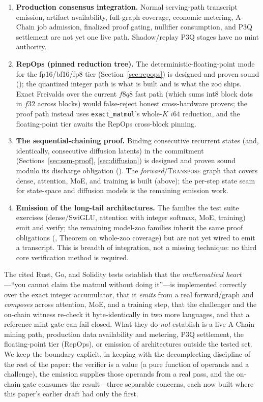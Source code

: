 \begin{enumerate}[leftmargin=1.6em]
\item \textbf{Production consensus integration.} Normal serving-path transcript emission,
artifact availability, full-graph coverage, economic metering, A-Chain job admission,
finalized proof gating, nullifier consumption, and P3Q settlement are not yet one live path.
Shadow/replay P3Q stages have no mint authority.
\item \textbf{RepOps (pinned reduction tree).} The deterministic-floating-point mode for the
fp16/bf16/fp8 tier (Section~\ref{sec:repops}) is designed and proven sound
(\cite{poisoundness}); the quantized integer path is what is built and is what the \Zoo{}
zoo ships. Exact Freivalds over the current $f8q8$ fast path (which sums int8 block dots in
$f32$ across blocks) would false-reject honest cross-hardware provers; the proof path
instead uses \texttt{exact\_matmul}'s whole-$K$ $i64$ reduction, and the floating-point tier
awaits the RepOps cross-block pinning.
\item \textbf{The sequential-chaining proof.} Binding consecutive recurrent states (and,
identically, consecutive diffusion latents) in the commitment
(Sections~\ref{sec:ssm-proof}, \ref{sec:diffusion}) is designed and proven sound modulo its
discharge obligation (\cite{poisoundness}). The \emph{forward}/\textsc{Transpose} graph that
covers dense, attention, MoE, and training is built (above); the per-step state seam for
state-space and diffusion models is the remaining emission work.
\item \textbf{Emission of the long-tail architectures.} The families the test suite
exercises (dense/SwiGLU, attention with integer softmax, MoE, training) emit and verify; the
remaining model-zoo families inherit the same proof obligations (\cite{poisoundness},
Theorem on whole-zoo coverage) but are not yet wired to emit a transcript. This is breadth
of integration, not a missing technique: no third core verification method is required.
\end{enumerate}

\begin{remark}
The cited Rust, Go, and Solidity tests establish that the
\emph{mathematical heart}---``you cannot claim the matmul without doing it''---is
implemented correctly over the exact integer accumulator, that it \emph{emits} from a real
forward/graph and \emph{composes} across attention, MoE, and a training step, that the
challenger and the on-chain witness re-check it byte-identically in two more languages, and
that a reference mint gate can fail closed. What they do \emph{not} establish is a live
A-Chain mining path, production data availability and metering, P3Q settlement, the
floating-point tier (RepOps), or emission of architectures outside the tested set. We keep the boundary explicit, in keeping with the decomplecting
discipline of the rest of the paper: the verifier is a value (a pure function of operands
and a challenge), the emission supplies those operands from a real pass, and the on-chain
gate consumes the result---three separable concerns, each now built where this paper's
earlier draft had only the first.
\end{remark}

